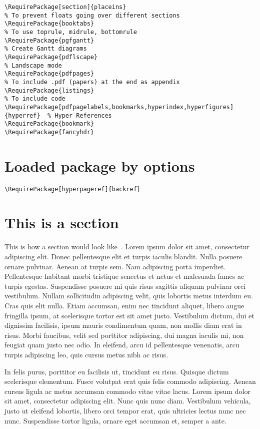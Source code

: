 {\begin{verbatim}
\RequirePackage[section]{placeins}																					% To prevent floats going over different sections
\RequirePackage{booktabs}																										% To use toprule, midrule, bottomrule
\RequirePackage{pgfgantt}																										% Create Gantt diagrams
\RequirePackage{pdflscape}																									% Landscape mode
\RequirePackage{pdfpages}																										% To include .pdf (papers) at the end as appendix
\RequirePackage{listings}																										% To include code
\RequirePackage[pdfpagelabels,bookmarks,hyperindex,hyperfigures]{hyperref}	% Hyper References
\RequirePackage{bookmark}	
\RequirePackage{fancyhdr}
\end{verbatim}
}

\section{Loaded package by options}

{\tiny
\begin{verbatim}
\RequirePackage[hyperpageref]{backref}
\end{verbatim}
}


\section{This is a section}

This is how a section would look like~\citep{espinoza2012inverse}.  Lorem ipsum dolor sit amet, consectetur adipiscing elit. Donec pellentesque elit et turpis iaculis blandit. Nulla posuere ornare pulvinar. Aenean at turpis sem. Nam adipiscing porta imperdiet. Pellentesque habitant morbi tristique senectus et netus et malesuada fames ac turpis egestas. Suspendisse posuere mi quis risus sagittis aliquam pulvinar orci vestibulum. Nullam sollicitudin adipiscing velit, quis lobortis metus interdum eu. Cras quis elit nulla. Etiam accumsan, enim nec tincidunt aliquet, libero augue fringilla ipsum, at scelerisque tortor est sit amet justo. Vestibulum dictum, dui et dignissim facilisis, ipsum mauris condimentum quam, non mollis diam erat in risus. Morbi faucibus, velit sed porttitor adipiscing, dui magna iaculis mi, non feugiat quam justo nec odio. In eleifend, arcu id pellentesque venenatis, arcu turpis adipiscing leo, quis cursus metus nibh ac risus.

In felis purus, porttitor eu facilisis ut, tincidunt eu risus. Quisque dictum scelerisque elementum. Fusce volutpat erat quis felis commodo adipiscing. Aenean cursus ligula ac metus accumsan commodo vitae vitae lacus. Lorem ipsum dolor sit amet, consectetur adipiscing elit. Nunc quis nunc diam. Vestibulum vehicula, justo ut eleifend lobortis, libero orci tempor erat, quis ultricies lectus nunc nec nunc. Suspendisse tortor ligula, ornare eget accumsan et, semper a ante.

